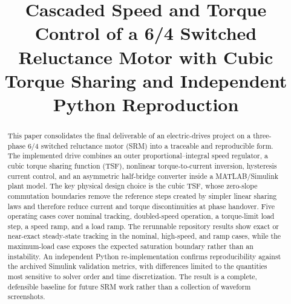 \documentclass[conference]{IEEEtran}
\begin{document}
\title{Cascaded Speed and Torque Control of a 6/4 Switched Reluctance Motor with Cubic Torque Sharing and Independent Python Reproduction}

\author{%
\and
{}
\and
{}
\and
{}
}

\maketitle

\begin{abstract}
This paper consolidates the final deliverable of an electric-drives project on a three-phase 6/4 switched reluctance motor (SRM) into a traceable and reproducible form.
The implemented drive combines an outer proportional--integral speed regulator, a cubic torque sharing function (TSF), nonlinear torque-to-current inversion, hysteresis current control, and an asymmetric half-bridge converter inside a MATLAB/Simulink plant model.
The key physical design choice is the cubic TSF, whose zero-slope commutation boundaries remove the reference steps created by simpler linear sharing laws and therefore reduce current and torque discontinuities at phase handover.
Five operating cases cover nominal tracking, doubled-speed operation, a torque-limit load step, a speed ramp, and a load ramp.
The rerunnable repository results show exact or near-exact steady-state tracking in the nominal, high-speed, and ramp cases, while the maximum-load case exposes the expected saturation boundary rather than an instability.
An independent Python re-implementation confirms reproducibility against the archived Simulink validation metrics, with differences limited to the quantities most sensitive to solver order and time discretization.
The result is a complete, defensible baseline for future SRM work rather than a collection of waveform screenshots.
\end{abstract}
\end{document}
